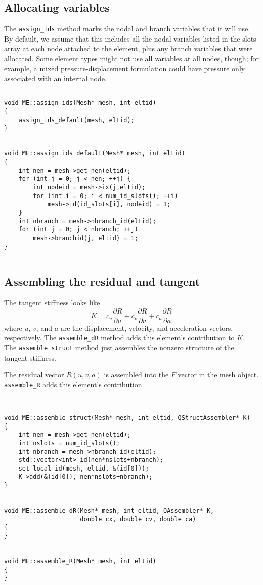 \subsection{Allocating variables}

The {\tt assign\_ids} method marks the nodal and branch variables
that it will use.  By default, we assume that this includes all the
nodal variables listed in the slots array at each node attached to
the element, plus any branch variables that were allocated.  Some
element types might not use all variables at all nodes, though; for
example, a mixed pressure-displacement formulation could have
pressure only associated with an internal node.

\begin{verbatim}

void ME::assign_ids(Mesh* mesh, int eltid)
{
    assign_ids_default(mesh, eltid);
}


void ME::assign_ids_default(Mesh* mesh, int eltid)
{
    int nen = mesh->get_nen(eltid);
    for (int j = 0; j < nen; ++j) {
        int nodeid = mesh->ix(j,eltid);
        for (int i = 0; i < num_id_slots(); ++i)
            mesh->id(id_slots[i], nodeid) = 1;
    }
    int nbranch = mesh->nbranch_id(eltid);
    for (int j = 0; j < nbranch; ++j)
        mesh->branchid(j, eltid) = 1;
}


\end{verbatim}
\subsection{Assembling the residual and tangent}

The tangent stiffness looks like
\[
K = c_u \frac{\partial R}{\partial u} +
c_v \frac{\partial R}{\partial v} +
c_a \frac{\partial R}{\partial a}
\]
where $u$, $v$, and $a$ are the displacement, velocity, and
acceleration vectors, respectively.  The {\tt assemble\_dR} method
adds this element's contribution to $K$.  The
{\tt assemble\_struct} method just assembles the nonzero structure
of the tangent stiffness.

The residual vector $R(u,v,a)$ is assembled into the $F$ vector in
the mesh object.  {\tt assemble\_R} adds this element's
contribution.

\begin{verbatim}


void ME::assemble_struct(Mesh* mesh, int eltid, QStructAssembler* K)
{
    int nen = mesh->get_nen(eltid);
    int nslots = num_id_slots();
    int nbranch = mesh->nbranch_id(eltid);
    std::vector<int> id(nen*nslots+nbranch);
    set_local_id(mesh, eltid, &(id[0]));
    K->add(&(id[0]), nen*nslots+nbranch);
}


void ME::assemble_dR(Mesh* mesh, int eltid, QAssembler* K,
                     double cx, double cv, double ca)
{
}


void ME::assemble_R(Mesh* mesh, int eltid)
{
}


\end{verbatim}
